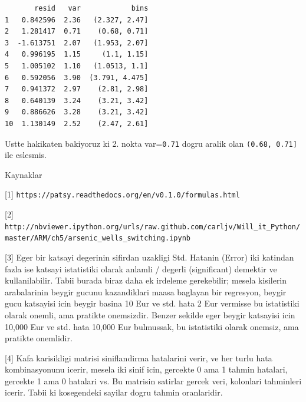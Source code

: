 \documentclass[12pt,fleqn]{article}\usepackage{../common}
\begin{document}
\begin{verbatim}
       resid   var            bins
1   0.842596  2.36   (2.327, 2.47]
2   1.281417  0.71    (0.68, 0.71]
3  -1.613751  2.07   (1.953, 2.07]
4   0.996195  1.15     (1.1, 1.15]
5   1.005102  1.10   (1.0513, 1.1]
6   0.592056  3.90  (3.791, 4.475]
7   0.941372  2.97    (2.81, 2.98]
8   0.640139  3.24    (3.21, 3.42]
9   0.886626  3.28    (3.21, 3.42]
10  1.130149  2.52    (2.47, 2.61]
\end{verbatim}

Ustte hakikaten bakiyoruz ki 2. nokta var=\verb!0.71! dogru
aralik olan \verb!(0.68, 0.71]! ile eslesmis.

Kaynaklar

[1] \verb!https://patsy.readthedocs.org/en/v0.1.0/formulas.html!

[2] \verb!http://nbviewer.ipython.org/urls/raw.github.com/carljv/Will_it_Python/master/ARM/ch5/arsenic_wells_switching.ipynb!

[3] Eger bir katsayi degerinin sifirdan uzakligi Std. Hatanin (Error) iki
katindan fazla ise katsayi istatistiki olarak anlamli / degerli
(significant) demektir ve kullanilabilir. Tabii burada biraz daha ek
irdeleme gerekebilir; mesela kisilerin arabalarinin beygir gucunu
kazandiklari maasa baglayan bir regresyon, beygir gucu katsayisi icin
beygir basina 10 Eur ve std. hata 2 Eur vermisse bu istatistiki olarak
onemli, ama pratikte onemsizdir. Benzer sekilde eger beygir katsayisi icin
10,000 Eur ve std. hata 10,000 Eur bulmussak, bu istatistiki olarak
onemsiz, ama pratikte onemlidir.

[4] Kafa karisikligi matrisi siniflandirma hatalarini verir, ve her turlu
hata kombinasyonunu icerir, mesela iki sinif icin, gercekte 0 ama 1 tahmin
hatalari, gercekte 1 ama 0 hatalari vs. Bu matrisin satirlar gercek veri,
kolonlari tahminleri icerir. Tabii ki kosegendeki sayilar dogru tahmin
oranlaridir.
\end{document}
